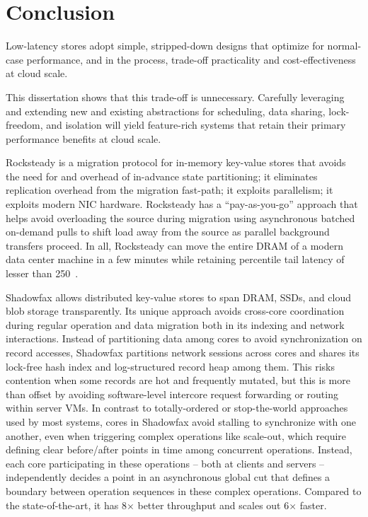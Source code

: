 \chapter{Conclusion}

Low-latency stores adopt simple, stripped-down designs that optimize
for normal-case performance, and in the process, trade-off
practicality and cost-effectiveness at cloud scale.

This dissertation shows that this trade-off is unnecessary. Carefully
leveraging and extending new and existing abstractions for scheduling,
data sharing, lock-freedom, and isolation will yield feature-rich
systems that
retain their primary performance benefits at cloud scale.

Rocksteady is a migration protocol for in-memory key-value stores that avoids
the need for and overhead of in-advance state partitioning; it eliminates
replication overhead from the migration fast-path; it exploits parallelism;
it exploits modern NIC hardware.  Rocksteady has a
``pay-as-you-go'' approach that helps avoid overloading the source during migration
using asynchronous batched on-demand pulls to shift load away from the source
as parallel background transfers proceed.  In all, Rocksteady can move the entire DRAM
of a modern data center machine in a few minutes while retaining \nnnth
percentile tail latency of lesser than 250~\us.

Shadowfax allows distributed key-value stores to
span DRAM, SSDs, and cloud blob storage transparently.
%
Its unique approach avoids cross-core coordination during
regular operation and data migration both in its indexing and network
interactions.
%
Instead of partitioning data among cores to avoid synchronization on record
accesses, Shadowfax partitions network
sessions across cores and shares its lock-free hash index and log-structured
record heap among them.
%
This risks contention when some records are hot and frequently
mutated, but this is more than offset by avoiding software-level
intercore request forwarding or routing within server VMs.
%
In contrast to totally-ordered or stop-the-world approaches used by most
systems, cores in Shadowfax avoid stalling to synchronize with one another, even when
triggering complex operations like scale-out, which require
defining clear before/after points in time among concurrent operations.
%
Instead, each core participating in these operations -- both at clients and
servers -- independently decides a point in an asynchronous global
cut that defines a boundary between operation sequences in these complex operations.
%
Compared to the state-of-the-art, it has 8$\times{}$ better throughput
and scales out 6$\times{}$ faster.

